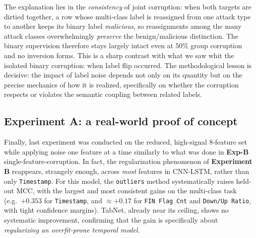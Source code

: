 \documentclass[a4paper, 9pt]{extarticle}
\begin{document}
The explanation lies in the \emph{consistency} of joint corruption: when both targets are dirtied together, a row whose multi-class label is reassigned from one attack type to another keeps its binary label \emph{malicious}, so reassignments among the many attack classes overwhelmingly \emph{preserve} the benign/malicious distinction. The binary supervision therefore stays largely intact even at $50\%$
group corruption and no inversion forms. This is a sharp contrast with what we saw whit the isolated binary corruption: when label flip occurred. The methodological lesson is decisive: the impact of label noise depends not only on its quantity but on the precise mechanics of how it is realized, specifically on whether the corruption respects or violates the semantic coupling between related labels.

\subsection{Experiment A: a real-world proof of concept}

Finally, last experiment was conducted on the reduced, high-signal $8$-feature set while applying noise one feature at a time similarly to what was done in \textbf{Exp-B} single-feature-corruption. In fact, the regularization phenomenon of \textbf{Experiment B} reappears, strangely enough, across \emph{most} features in CNN-LSTM, rather than only \texttt{Timestamp}. For this model, the \texttt{outliers} method systematically raises held-out MCC, with the largest and most consistent gains on the multi-class task (e.g.\ $+0.353$ for \texttt{Timestamp}, and $\approx +0.17$ for \texttt{FIN Flag Cnt} and \texttt{Down/Up Ratio}, with tight confidence margins).
TabNet, already near its ceiling, shows no systematic improvement, confirming that the gain is specifically about \emph{regularizing an overfit-prone temporal model}.
\end{document}
